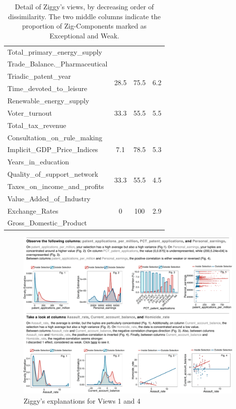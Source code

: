 \begin{table}[!t]
\begin{tabular}{p{4cm} c c c}
        Total\_primary\_energy\_supply&&&\\ 
        Trade\_Balance.\_Pharmaceutical&&&\\ 
        \hline
        Triadic\_patent\_year&
        \multirow{2}{*}{28.5} &\multirow{2}{*}{75.5} & \multirow{2}{*}{6.2} \\
        Time\_devoted\_to\_leisure&&&\\ 
        \hline
        Renewable\_energy\_supply&
        \multirow{3}{*}{33.3} &\multirow{3}{*}{55.5} & \multirow{3}{*}{5.5} \\
        Voter\_turnout&&&\\ 
        Total\_tax\_revenue&&&\\ 
        \hline
        Consultation\_on\_rule\_making&
        \multirow{3}{*}{7.1} &\multirow{3}{*}{78.5} & \multirow{3}{*}{5.3} \\
        Implicit\_GDP\_Price\_Indices&&&\\
        Years\_in\_education&&&\\
        \hline
        Quality\_of\_support\_network&
        \multirow{2}{*}{33.3} &\multirow{2}{*}{55.5} & \multirow{2}{*}{4.5} \\
        Taxes\_on\_income\_and\_profits&&&\\
        \hline
        Value\_Added\_of\_Industry&
        \multirow{3}{*}{0} &\multirow{3}{*}{100} & \multirow{3}{*}{2.9} \\
        Exchange\_Rates&&&\\
        Gross\_Domestic\_Product&&&\\
        \hline
    \end{tabular}
    \caption{Detail of Ziggy's views, by decreasing order of dissimilarity. The
    two middle columns indicate the proportion of Zig-Components marked  as
Exceptional and Weak.}
    \label{tab:ziggysviews}
\end{table}
\begin{figure}[!ht]
  \centering
  \includegraphics[width=2.05\columnwidth]{Figures/UseCase}
  \caption{Ziggy's explanations for Views 1 and 4}
  \label{pic:zigdetail}
\end{figure}
